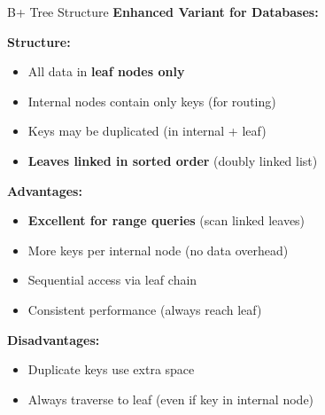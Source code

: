 \documentclass[aspectratio=169]{beamer}
\begin{document}
\begin{frame}{B+ Tree Structure}
  \textbf{Enhanced Variant for Databases:}

  \vspace{0.3cm}
  \textbf{Structure:}
  \begin{itemize}
    \item All data in \textbf{leaf nodes only}
    \item Internal nodes contain only keys (for routing)
    \item Keys may be duplicated (in internal + leaf)
    \item \textbf{Leaves linked in sorted order} (doubly linked list)
  \end{itemize}

  \vspace{0.3cm}
  \textbf{Advantages:}
  \begin{itemize}
    \item \textbf{Excellent for range queries} (scan linked leaves)
    \item More keys per internal node (no data overhead)
    \item Sequential access via leaf chain
    \item Consistent performance (always reach leaf)
  \end{itemize}

  \vspace{0.3cm}
  \textbf{Disadvantages:}
  \begin{itemize}
    \item Duplicate keys use extra space
    \item Always traverse to leaf (even if key in internal node)
  \end{itemize}
\end{frame}
\end{document}
